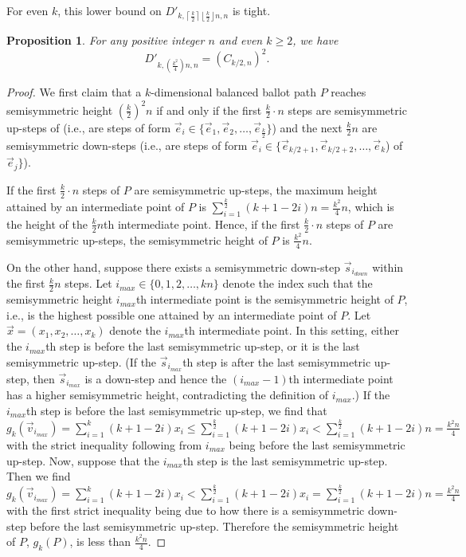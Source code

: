 \documentclass[11pt]{article}
\newtheorem{proposition}[theorem]{Proposition}
\theoremstyle{remark}
\theoremstyle{definition}
\begin{document}
For even $k$, this lower bound on $D'_{k, \left\lceil \frac{k}{2}\right\rceil \left\lfloor \frac{k}{2}\right\rfloor n, n}$ is tight.
\begin{proposition}\label{prop:DprimeCk2}
    For any positive integer $n$ and even $k \geq 2$, we have $$D'_{k, \left(\frac{k^2}{4}\right) n, n} = ({C}_{k/2, n})^2.$$
\end{proposition}
\begin{proof}
    We first claim that a $k$-dimensional balanced ballot path  $P$ reaches semisymmetric height $\left(\frac{k}{2}\right)^2 n$ if and only if the first $\frac{k}{2} \cdot n$ steps are semisymmetric up-steps of (i.e., are steps of form $\vec{e}_i \in \{ \vec{e}_1, \vec{e}_2, \ldots, \vec{e}_{\frac{k}{2}} \}$) and the next $\frac{k}{2}n$ are semisymmetric down-steps (i.e., are steps of form $\vec{e}_i \in \{\vec{e}_{k/2+1}, \vec{e}_{k/2+2}, \dots, \vec{e}_k$) of $\vec{e}_j\}$).
    
    If the first $\frac{k}{2} \cdot n$ steps of $P$ are semisymmetric up-steps, the maximum height attained by an intermediate point of $P$ is $\sum_{i=1}^{\frac{k}{2}}(k+1-2i)n = \frac{k^2}{4}n$, which is the height of the $\frac{k}{2}n$th intermediate point. Hence, if the first $\frac{k}{2} \cdot n$ steps of $P$ are semisymmetric up-steps, the semisymmetric height of $P$ is  $\frac{k^2}{4}n$. 
    
    On the other hand, suppose there exists a semisymmetric down-step $\vec{s}_{i_{down}}$ within the first $\frac{k}{2}n$ steps. Let  $i_{max} \in \{0, 1, 2, \dots, kn\}$ denote the index such that the semisymmetric height $i_{max}$th intermediate point is the semisymmetric height of $P$, i.e., is the highest possible one attained by an intermediate point of $P$. Let $\vec{x} = (x_1, x_2, \dots, x_k)$ denote the $i_{max}$th intermediate point. In this setting, either the $i_{max}$th step is before the last semisymmetric up-step, or it is the last semisymmetric up-step. (If the $\vec{s}_{i_{max}}$th step is after the last semisymmetric up-step, then $\vec{s}_{i_{max}}$ is a down-step and hence the $(i_{max}-1)$th intermediate point has a higher semisymmetric height, contradicting the definition of $i_{max}$.) If the $i_{max}$th step is before the last semisymmetric up-step, we find that $g_k(\vec{v}_{i_{max}}) = \sum_{i=1}^{k}(k+1-2i)x_i \leq \sum_{i=1}^{\frac{k}{2}}(k+1-2i)x_i < \sum_{i=1}^{\frac{k}{2}}(k+1-2i) n = \frac{k^2n}{4}$ with the strict inequality following from $i_{max}$ being before the last semisymmetric up-step.  Now, suppose that the $i_{max}$th step is the last semisymmetric up-step. Then we find 
    $g_k(\vec{v}_{i_{max}})= \sum_{i=1}^{k}(k+1-2i)x_i < \sum_{i=1}^{\frac{k}{2}}(k+1-2i)x_i = \sum_{i=1}^{\frac{k}{2}}(k+1-2i) n = \frac{k^2n}{4}$ with the first strict inequality being due to how there is a semisymmetric down-step before the last semisymmetric up-step. Therefore the semisymmetric height of $P$, $g_k(P)$, is less than $\frac{k^2n}{4}$.


\end{proof}
\end{document}

